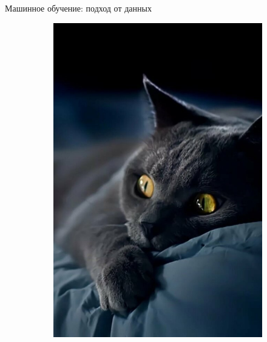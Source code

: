 \documentclass[aspectratio=169]{beamer}
\begin{document}
\begin{frame}{Машинное обучение: подход от данных}
\begin{figure}
\begin{subfigure}[b]{.1\linewidth}
            \includegraphics[width=\linewidth]{graphs/fig14_3.jpg}
        \end{subfigure}
        \begin{subfigure}[b]{.1\linewidth}

\end{subfigure}
\end{figure}
\end{frame}
\end{document}
